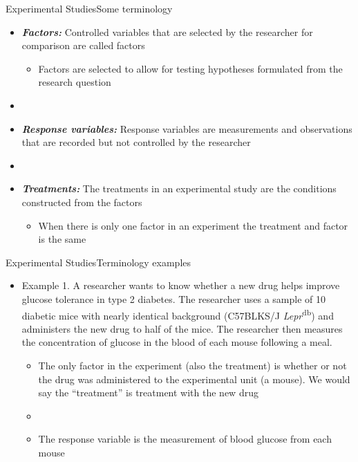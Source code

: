 \documentclass[xcolor=dvipsnames]{beamer}
\begin{document}
\begin{frame}{Experimental Studies}{Some terminology}
	\begin{itemize}
			\item \textbf{\emph{Factors:}} Controlled variables that are selected by the researcher for comparison are called factors \pause
		\begin{itemize}
			\item Factors are selected to allow for testing hypotheses formulated from the research question \pause
		\end{itemize}
		\item[]
		\item \textbf{\emph{Response variables:}} Response variables are measurements and observations that are recorded but not controlled by the researcher \pause
		\item[]
		\item \textbf{\emph{Treatments:}} The treatments in an experimental study are the conditions constructed from the factors \pause
		\begin{itemize}
			\item When there is only one factor in an experiment the treatment and factor is the same
		\end{itemize}
	\end{itemize}
\end{frame}

\begin{frame}{Experimental Studies}{Terminology examples}
	\begin{itemize}
		\item Example 1. A researcher wants to know whether a new drug helps improve glucose tolerance in type 2 diabetes. The researcher uses a sample of 10 diabetic mice with nearly identical background (C57BLKS/J \emph{Lepr}\textsuperscript{db}) and administers the new drug to half of the mice. The researcher then measures the concentration of glucose in the blood of each mouse following a meal. \pause
		\begin{itemize}
			\item The only factor in the experiment (also the treatment) is whether or not the drug was administered to the experimental unit (a mouse). We would say the ``treatment'' is treatment with the new drug \pause
			\item[]
			\item The response variable is the measurement of blood glucose from each mouse
		\end{itemize}
	\end{itemize}
\end{frame}
\end{document}
